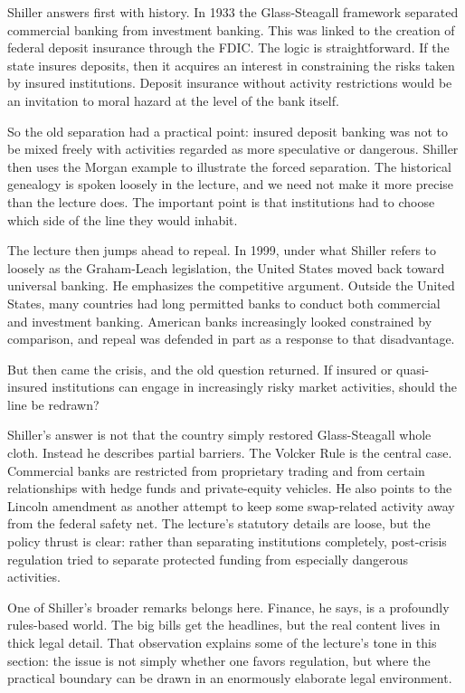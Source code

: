 Shiller answers first with history. In 1933 the Glass-Steagall framework separated commercial banking from investment banking. This was linked to the creation of federal deposit insurance through the FDIC. The logic is straightforward. If the state insures deposits, then it acquires an interest in constraining the risks taken by insured institutions. Deposit insurance without activity restrictions would be an invitation to moral hazard at the level of the bank itself.

So the old separation had a practical point: insured deposit banking was not to be mixed freely with activities regarded as more speculative or dangerous. Shiller then uses the Morgan example to illustrate the forced separation. The historical genealogy is spoken loosely in the lecture, and we need not make it more precise than the lecture does. The important point is that institutions had to choose which side of the line they would inhabit.

The lecture then jumps ahead to repeal. In 1999, under what Shiller refers to loosely as the Graham-Leach legislation, the United States moved back toward universal banking. He emphasizes the competitive argument. Outside the United States, many countries had long permitted banks to conduct both commercial and investment banking. American banks increasingly looked constrained by comparison, and repeal was defended in part as a response to that disadvantage.

But then came the crisis, and the old question returned. If insured or quasi-insured institutions can engage in increasingly risky market activities, should the line be redrawn?

Shiller's answer is not that the country simply restored Glass-Steagall whole cloth. Instead he describes partial barriers. The Volcker Rule is the central case. Commercial banks are restricted from proprietary trading and from certain relationships with hedge funds and private-equity vehicles. He also points to the Lincoln amendment as another attempt to keep some swap-related activity away from the federal safety net. The lecture's statutory details are loose, but the policy thrust is clear: rather than separating institutions completely, post-crisis regulation tried to separate protected funding from especially dangerous activities.

One of Shiller's broader remarks belongs here. Finance, he says, is a profoundly rules-based world. The big bills get the headlines, but the real content lives in thick legal detail. That observation explains some of the lecture's tone in this section: the issue is not simply whether one favors regulation, but where the practical boundary can be drawn in an enormously elaborate legal environment.

